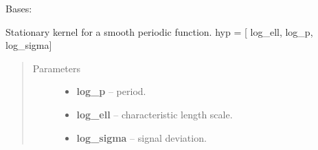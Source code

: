 \documentclass[letterpaper,10pt,english]{sphinxmanual}
\begin{document}

\begin{fulllineitems}
\label{pyGPs.Core:pyGPs.Core.cov.Periodic}
Bases: {\hyperref[pyGPs.Core:pyGPs.Core.cov.Kernel]{}}

Stationary kernel for a smooth periodic function. 
hyp = {[} log\_ell, log\_p, log\_sigma{]}
\begin{quote}\begin{description}
\item[{Parameters}] \leavevmode\begin{itemize}
\item {} 
\textbf{log\_p} -- period.

\item {} 
\textbf{log\_ell} -- characteristic length scale.

\item {} 
\textbf{log\_sigma} -- signal deviation.

\end{itemize}

\end{description}\end{quote}

\begin{fulllineitems}
\label{pyGPs.Core:pyGPs.Core.cov.Periodic.getCovMatrix}
\end{fulllineitems}


\begin{fulllineitems}
\label{pyGPs.Core:pyGPs.Core.cov.Periodic.getDerMatrix}
\end{fulllineitems}


\end{fulllineitems}

\end{document}
